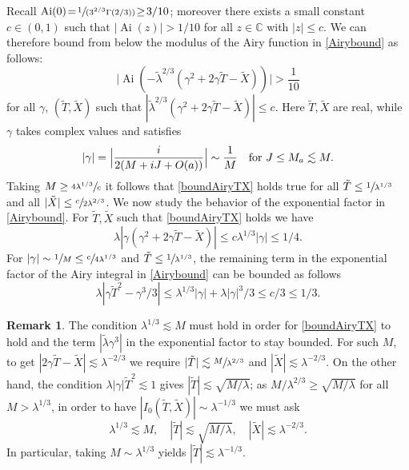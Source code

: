 \documentclass[JEP,XML,SOM,Unicode,NoEqCountersInSection,NoFloatCountersInSection,published]{cedram}
\newcommand{\spfrac}[2]{\sfrac{#1}{(#2)}}
\DeclareMathOperator{\Ai}{Ai}
\theoremstyle{plain}
\theoremstyle{definition}
\newtheorem{rmq}{Remark}[section]
\begin{document}
Recall $\Ai(0)\!=\!\spfrac{1}{3^{2/3}\Gamma(2/3)}\!\geq\!3/10$; moreover there exists a small constant $c\!\in\!(0,1)$ such that $|\Ai(z)|>1/10$ for all $z\in\mathbb{C}$ with $|z|\leq c$. We can therefore bound from below the modulus of the Airy function in \eqref{Airybound} as follows:
\begin{equation}\label{boundAiryTX}
\bigl|\Ai(-\tilde\lambda^{2/3}(\gamma^2+2\gamma \tilde T-\tilde X))\bigr|>\frac 1 {10}
\end{equation}
for all $\gamma$, $(\tilde T,\tilde X)$ such that $|\tilde\lambda^{2/3}(\gamma^2+2\gamma \tilde T-\tilde X)|\leq c$. Here $\tilde T,\tilde X$ are real, while $\gamma$ takes complex values and satisfies
\[
|\gamma|= \Bigl |\frac{i}{2(M+iJ+O(a))}\Bigr|\sim \frac{1}{M}\quad\text{for }J\leq M_a\lesssim M.
\]
Taking $M\geq \sfrac{4\lambda^{1/3}}{c}$ it follows that \eqref{boundAiryTX} holds true for all $\tilde T\leq \sfrac{1}{\lambda^{1/3}}$ and all $|\tilde X|\leq \sfrac{c}{2\lambda^{2/3}}$.
We now study the behavior of the exponential factor in \eqref{Airybound}. For $\tilde T,\tilde X$ such that \eqref{boundAiryTX} holds we have
\[
\lambda |\gamma(\gamma^2+2\gamma \tilde T-\tilde X)|\leq c\lambda^{1/3}|\gamma|\leq 1/4.
\]
For $|\gamma|\sim \sfrac{1}{M}\leq \sfrac{c}{4\lambda^{1/3}}$ and $\tilde T\leq \sfrac{1}{\lambda^{1/3}}$, the remaining term in the exponential factor of the Airy integral in \eqref{Airybound} can be bounded as follows
\begin{equation}\label{condT}
\lambda |\gamma \tilde T^2-\gamma^3/3|\leq \lambda^{1/3}|\gamma|+\lambda |\gamma|^3/3\leq c/3\leq 1/3.
\end{equation}
\begin{rmq}
The condition $\lambda^{1/3}\lesssim M$ must hold in order for \eqref{boundAiryTX} to hold and the term $|\tilde\lambda\gamma^3|$ in the exponential factor to stay bounded. For such $M$, to get $|2\gamma \tilde T-\tilde X|\lesssim \lambda^{-2/3}$ we require $|\tilde T|\lesssim \sfrac{M}{\lambda^{2/3}}$ and $|\tilde X |\lesssim \lambda^{-2/3}$. On the other hand, the condition $\lambda |\gamma|\tilde T^2\lesssim 1$ gives $|\tilde T|\lesssim \sqrt{M/\lambda}$; as $M/\lambda^{2/3}\geq \sqrt{M/\lambda}$ for all $M>\lambda^{1/3}$, in order to have $|I_0(\tilde T,\tilde X)|\sim \lambda^{-1/3}$ we must ask
\begin{equation}\label{condTX}
\lambda^{1/3}\lesssim M,\quad |\tilde T|\lesssim \sqrt{M/\lambda}, \quad |\tilde X|\lesssim \lambda^{-2/3}.
\end{equation}
In particular, taking $M\sim \lambda^{1/3}$ yields $|\tilde T|\lesssim \lambda^{-1/3}$.
\end{rmq}
\end{document}
